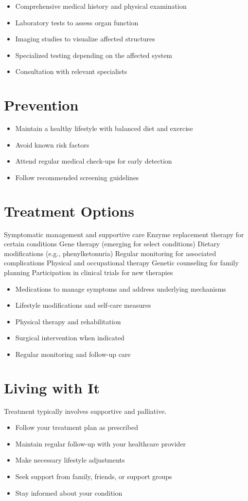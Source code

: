 \begin{itemize}[noitemsep]
  \item Comprehensive medical history and physical examination
  \item Laboratory tests to assess organ function
  \item Imaging studies to visualize affected structures
  \item Specialized testing depending on the affected system
  \item Consultation with relevant specialists
\end{itemize}
\section{Prevention}
\begin{itemize}[noitemsep]
  \item Maintain a healthy lifestyle with balanced diet and exercise
  \item Avoid known risk factors
  \item Attend regular medical check-ups for early detection
  \item Follow recommended screening guidelines
\end{itemize}
\section{Treatment Options}
Symptomatic management and supportive care Enzyme replacement therapy for certain conditions Gene therapy (emerging for select conditions) Dietary modifications (e.g., phenylketonuria) Regular monitoring for associated complications Physical and occupational therapy Genetic counseling for family planning Participation in clinical trials for new therapies

\begin{itemize}[noitemsep]
  \item Medications to manage symptoms and address underlying mechanisms
  \item Lifestyle modifications and self-care measures
  \item Physical therapy and rehabilitation
  \item Surgical intervention when indicated
  \item Regular monitoring and follow-up care
\end{itemize}
\section{Living with It}
Treatment typically involves supportive and palliative.

\begin{itemize}[noitemsep]
  \item Follow your treatment plan as prescribed
  \item Maintain regular follow-up with your healthcare provider
  \item Make necessary lifestyle adjustments
  \item Seek support from family, friends, or support groups
  \item Stay informed about your condition
\end{itemize}
